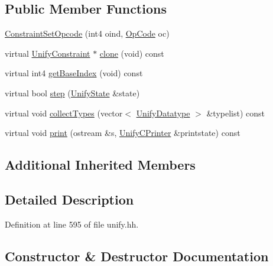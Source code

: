 \subsection*{Public Member Functions}
\begin{DoxyCompactItemize}
\item 
\mbox{\hyperlink{class_constraint_set_opcode_a9850af340e26bb441e8928a9d8932cdd}{Constraint\+Set\+Opcode}} (int4 oind, \mbox{\hyperlink{opcodes_8hh_abeb7dfb0e9e2b3114e240a405d046ea7}{Op\+Code}} oc)
\item 
virtual \mbox{\hyperlink{class_unify_constraint}{Unify\+Constraint}} $\ast$ \mbox{\hyperlink{class_constraint_set_opcode_a619038e1115459c881218dce94f186d8}{clone}} (void) const
\item 
virtual int4 \mbox{\hyperlink{class_constraint_set_opcode_aa860868c8820d374ee09d0cc24083613}{get\+Base\+Index}} (void) const
\item 
virtual bool \mbox{\hyperlink{class_constraint_set_opcode_a673db34a5b11dc6e004f481d0cccac9e}{step}} (\mbox{\hyperlink{class_unify_state}{Unify\+State}} \&state)
\item 
virtual void \mbox{\hyperlink{class_constraint_set_opcode_acfa6f851bec946e149a316c794768feb}{collect\+Types}} (vector$<$ \mbox{\hyperlink{class_unify_datatype}{Unify\+Datatype}} $>$ \&typelist) const
\item 
virtual void \mbox{\hyperlink{class_constraint_set_opcode_a460e6a003c470a7272fe89c72e6acfd3}{print}} (ostream \&s, \mbox{\hyperlink{class_unify_c_printer}{Unify\+C\+Printer}} \&printstate) const
\end{DoxyCompactItemize}
\subsection*{Additional Inherited Members}


\subsection{Detailed Description}


Definition at line 595 of file unify.\+hh.



\subsection{Constructor \& Destructor Documentation}
\mbox{\label{class_constraint_set_opcode_a9850af340e26bb441e8928a9d8932cdd}} 
